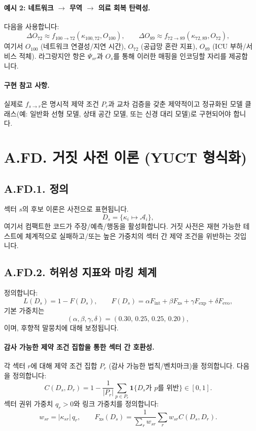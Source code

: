\documentclass[13pt,a4paper]{article}
\newcommand{\abs}[1]{\left|#1\right|}
\newcommand{\indicator}{\mathbf{1}}
\begin{document}
	\paragraph{예시 2: 네트워크 $\rightarrow$ 무역 $\rightarrow$ 의료 회복 탄력성.}
	다음을 사용합니다:
	$$
	\Delta O_{72}\approx f_{100\to72}(\kappa_{100,72},O_{100}),\qquad
	\Delta O_{89}\approx f_{72\to89}(\kappa_{72,89},O_{72}),
	$$
	여기서 $O_{100}$ (네트워크 연결성/지연 시간), $O_{72}$ (공급망 혼란 지표), $O_{89}$ (ICU 부하/서비스 적체). 라그랑지안 항은 $\Psi_{sr}$과 $O_s$를 통해 이러한 매핑을 인코딩할 자리를 제공합니다.
	
	\paragraph{구현 참고 사항.}
	실제로 $f_{s\to r}$은 명시적 제약 조건 $P_r$과 교차 검증을 갖춘 제약적이고 정규화된 모델 클래스(예: 일반화 선형 모델, 상태 공간 모델, 또는 신경 대리 모델)로 구현되어야 합니다.
	
	\section*{A.FD. 거짓 사전 이론 (YUCT 형식화)}
	
	\subsection*{A.FD.1. 정의}
	섹터 $s$의 후보 이론은 사전으로 표현됩니다.
	\[
	D_s=\{\kappa_i\mapsto \mathcal{A}_i\},
	\]
	여기서 컴팩트한 코드가 주장/예측/행동을 활성화합니다. 거짓 사전은 재현 가능한 테스트에 체계적으로 실패하고/또는 높은 가중치의 섹터 간 제약 조건을 위반하는 것입니다.
	
	\subsection*{A.FD.2. 허위성 지표와 마킹 체계}
	정의합니다:
	\[
	L(D_s)=1-F(D_s),\qquad
	F(D_s)=\alpha F_{\mathrm{int}}+\beta F_{\mathrm{xs}}+\gamma F_{\mathrm{exp}}+\delta F_{\mathrm{evo}},
	\]
	기본 가중치는
	\[
	(\alpha,\beta,\gamma,\delta)=(0.30,\,0.25,\,0.25,\,0.20),
	\]
	이며, 후향적 말뭉치에 대해 보정됩니다.
	
	\paragraph{감사 가능한 제약 조건 집합을 통한 섹터 간 호환성.}
	각 섹터 $r$에 대해 제약 조건 집합 $P_r$ (감사 가능한 법칙/벤치마크)을 정의합니다. 다음을 정의합니다:
	\[
	C(D_s,D_r)=1-\frac{1}{|P_r|}\sum_{p\in P_r}\indicator\{D_s\text{가 }p\text{를 위반}\}\in[0,1].
	\]
	섹터 권위 가중치 $q_r>0$와 링크 가중치를 정의합니다:
	\[
	w_{sr}=\abs{\kappa_{sr}}\,q_r,\qquad
	F_{\mathrm{xs}}(D_s)=\frac{1}{\sum_r w_{sr}}\sum_{r}w_{sr}C(D_s,D_r).
	\]
	
\end{document}
